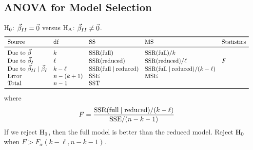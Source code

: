 \subsection*{ANOVA for Model Selection}
$ \text{H}_0 $: $ \vec{\beta}_{II}=\vec{0} $ versus $ \text{H}_{\text{A}} $: $ \vec{\beta}_{II}\ne \vec{0} $.
\[ \begin{array}{lllll}
        \toprule
        \text{Source}                                            & \text{df} & \text{SS}                                 & \text{MS}                                          & \text{Statistics} \\
        \midrule
        \text{Due to }\Vector{\beta}                             & k         & \text{SSR}(\text{full})                   & \text{SSR}(\text{full})/k                          &                   \\
        \text{Due to }\Vector{\beta}_{I}                         & \ell      & \text{SSR}(\text{reduced})                & \text{SSR}(\text{reduced})/\ell                    & F                 \\
        \text{Due to }\Vector{\beta}_{II}\mid \Vector{\beta}_{I} & k-\ell    & \text{SSR}(\text{full}\mid\text{reduced}) & \text{SSR}(\text{full}\mid\text{reduced})/(k-\ell) &                   \\
        \text{Error}                                             & n-(k+1)   & \SSE                                      & \MSE                                               &                   \\
        \text{Total}                                             & n-1       & \SST                                                                                                               \\
        \bottomrule
    \end{array} \]
where
\[ F=\frac{\text{SSR}(\text{full}\mid\text{reduced})/(k-\ell)}{\text{SSE}/(n-k-1)} \]
If we reject $ \text{H}_0 $, then the full model is better than the reduced model.
Reject $ \text{H}_0 $ when $ F>F_{\alpha}(k-\ell,n-k-1) $.
